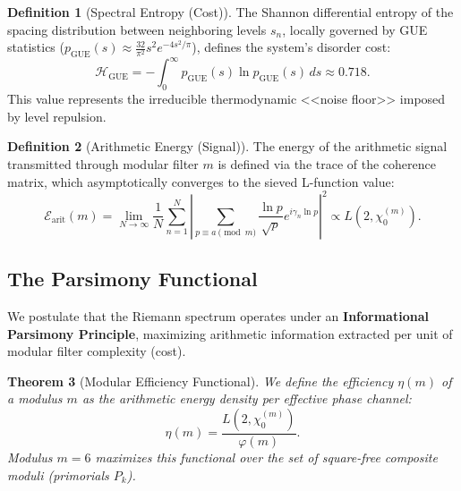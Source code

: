 \documentclass[12pt, a4paper]{article}
\theoremstyle{plain}
\newtheorem{teorema}{Theorem}[section]
\theoremstyle{definition}
\newtheorem{definicion}[teorema]{Definition}
\theoremstyle{remark}
\begin{document}
\begin{definicion}[Spectral Entropy (Cost)]
The Shannon differential entropy of the spacing distribution between neighboring levels $s_n$, locally governed by GUE statistics ($p_{\text{GUE}}(s) \approx \frac{32}{\pi^2}s^2 e^{-4s^2/\pi}$), defines the system's disorder cost:
\[
\mathcal{H}_{\text{GUE}} = - \int_0^\infty p_{\text{GUE}}(s) \ln p_{\text{GUE}}(s) \, ds \approx 0.718.
\]
This value represents the irreducible thermodynamic <<noise floor>> imposed by level repulsion.
\end{definicion}

\begin{definicion}[Arithmetic Energy (Signal)]
The energy of the arithmetic signal transmitted through modular filter $m$ is defined via the trace of the coherence matrix, which asymptotically converges to the sieved L-function value:
\[
\mathcal{E}_{\text{arit}}(m) = \lim_{N \to \infty} \frac{1}{N} \sum_{n=1}^N \left| \sum_{p \equiv a \pmod m} \frac{\ln p}{\sqrt{p}} e^{i\gamma_n \ln p} \right|^2 \propto L(2, \chi_0^{(m)}).
\]
\end{definicion}

\subsection{The Parsimony Functional}

We postulate that the Riemann spectrum operates under an \textbf{Informational Parsimony Principle}, maximizing arithmetic information extracted per unit of modular filter complexity (cost).

\begin{teorema}[Modular Efficiency Functional]
We define the efficiency $\eta(m)$ of a modulus $m$ as the arithmetic energy density per effective phase channel:
\[
\eta(m) = \frac{L(2, \chi_0^{(m)})}{\varphi(m)}.
\]
Modulus $m=6$ maximizes this functional over the set of square-free composite moduli (primorials $P_k$).
\end{teorema}
\end{document}

